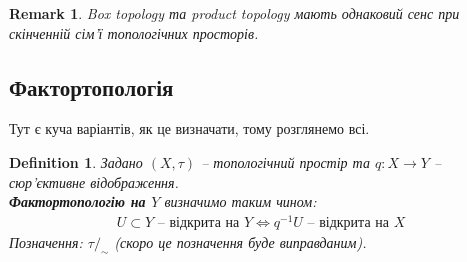 \documentclass[a4paper, 10pt]{article}
\theoremstyle{theoremdd}
\newtheorem{definition}[theorem]{Definition}
\newtheorem{remark}[theorem]{Remark}
\begin{document}
\begin{remark}
Box topology та product topology мають однаковий сенс при скінченній сім'ї топологічних просторів.
\end{remark}

\iffalse
\begin{remark}
Можна узагальнити означення добутку топології. Маємо $\{(X_\alpha,\tau_\alpha)\}$ -- сім'я топологічних просторів та $X = \displaystyle\prod_{\alpha} X_\alpha$ -- декартів добуток. Якщо визначити клас
\begin{align*}
\mathcal{B} = \left\{ \prod_{\alpha} U_\alpha \mid U_\alpha \in \tau_\alpha, U_\alpha \neq X_\alpha \text{ лише скінченне число разів} \right\},
\end{align*}
то вона утворить базу множини $X$, а тому можна утворити топологію.\\
Позначення: $\displaystyle\prod_\alpha \tau_\alpha \overset{\text{def.}}{=} \tau_{\mathcal{B}}$.
\end{remark}
\fi

\subsection{Фактортопологія}
\noindent
Тут є куча варіантів, як це визначати, тому розглянемо всі.

\begin{definition}
Задано $(X,\tau)$ -- топологічний простір та $q \colon X \to Y$ -- сюр'єктивне відображення.\\
\textbf{Фактортопологію на $Y$} визначимо таким чином:
\begin{align*}
U \subset Y \text{ -- відкрита на } Y \iff q^{-1}U \text{ -- відкрита на } X
\end{align*}
Позначення: $\tau/_\sim$ (скоро це позначення буде виправданим).
\end{definition}
\end{document}
